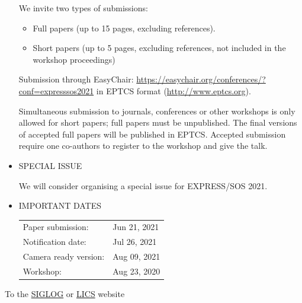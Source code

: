 \documentclass[prodmode,acmtecs]{acmsmall} %
\begin{document}
\begin{itemize}
  We invite two types of submissions: 
 
\begin{itemize}\item  Full papers (up to 15 pages, excluding references).
\item  Short papers (up to 5 pages, excluding references, not included in the workshop proceedings)
\end{itemize} 
  Submission through EasyChair: \href{https://easychair.org/conferences/?conf=expresssos2021}{https://easychair.org/conferences/?conf=expresssos2021} in EPTCS format (\href{http://www.eptcs.org}{http://www.eptcs.org}). 
 
  Simultaneous submission to journals, conferences or other workshops is only allowed for short papers; full papers must be unpublished. The final versions of accepted full papers will be published in EPTCS. Accepted submission require one co-authors to register to the workshop and give the talk. 
 
\item  SPECIAL ISSUE 
 
  We will consider organising a special issue for EXPRESS/SOS 2021. 
 
\item  IMPORTANT DATES 
 
\begin{tabulary}{\linewidth}{LL}Paper submission:  & Jun 21, 2021 \\
Notification date:  & Jul 26, 2021 \\
Camera ready version:  & Aug 09, 2021 \\
Workshop:  & Aug 23, 2020 \\
\end{tabulary}
 
\end{itemize}


To the \href{http://siglog.org/}{SIGLOG} or \href{https://lics.siglog.org}{LICS} website
\end{document}
